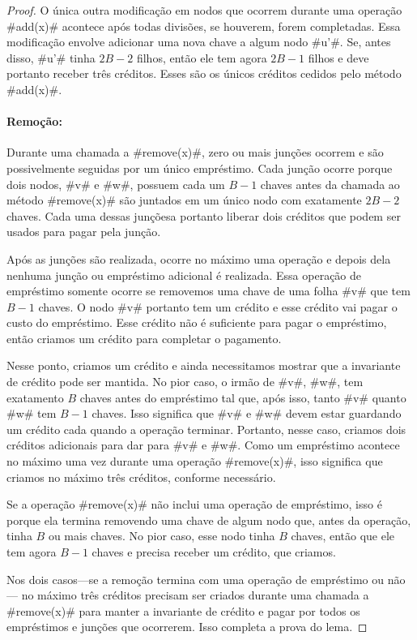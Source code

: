 \begin{proof}
  O única outra modificação em nodos que ocorrem durante uma operação
  #add(x)# acontece após todas divisões, se houverem, forem completadas.
Essa modificação envolve adicionar uma nova chave a algum nodo #u'#.
Se, antes disso, 
#u'# tinha $2B-2$ filhos, então ele tem agora $2B-1$ filhos e deve portanto
  receber três créditos. Esses são os únicos créditos cedidos pelo método #add(x)#.

  \paragraph{Remoção:}
  Durante uma chamada a 
#remove(x)#, zero ou mais junções ocorrem e são possivelmente seguidas por um único empréstimo. Cada junção ocorre porque dois nodos, 
  #v# e #w#, possuem cada um $B-1$ chaves antes da chamada ao método
  #remove(x)# são juntados em um único nodo com exatamente $2B-2$ chaves.
Cada uma dessas junçõesa portanto liberar dois créditos que podem ser usados para pagar pela junção.

  Após as junções são realizada, ocorre no máximo uma operação e depois dela nenhuma junção ou empréstimo adicional é realizada.
Essa operação de empréstimo somente ocorre se removemos uma chave de uma
folha #v# que tem $B-1$ chaves.
O nodo #v# portanto tem um crédito e esse crédito vai pagar o custo do 
empréstimo. Esse crédito não é suficiente para pagar o empréstimo, então
criamos um crédito para completar o pagamento.

Nesse ponto, criamos um crédito e ainda necessitamos mostrar que a invariante
de crédito pode ser mantida. No pior caso, o irmão de #v#, #w#, tem
exatamento $B$ chaves antes do empréstimo tal que, após isso, tanto #v# quanto #w#
tem $B-1$ chaves. Isso significa que #v# e #w# devem estar guardando um
crédito cada quando a operação terminar.
Portanto, nesse caso, criamos dois créditos adicionais para dar para #v# e #w#.
Como um empréstimo acontece no máximo uma vez durante uma operação 
#remove(x)#, isso significa que criamos no máximo três créditos, conforme necessário. 

Se a operação #remove(x)# não inclui uma operação de empréstimo, isso é porque ela termina removendo uma chave de algum nodo que, antes da operação, tinha $B$ ou mais chaves. No pior caso, esse nodo tinha $B$ chaves, então que ele tem agora $B-1$ chaves e precisa receber um crédito, que criamos. 

Nos dois casos---se a remoção termina com uma operação de empréstimo ou não---
no máximo três créditos precisam ser criados durante uma chamada a 
  #remove(x)# para manter a invariante de crédito e pagar por todos
  os empréstimos e junções que ocorrerem. Isso completa a prova do lema. 
\end{proof}

